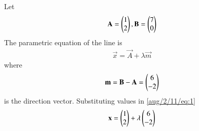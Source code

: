 Let 
\begin{align}
 \mathbf{A}=\begin{pmatrix}1\\2\end{pmatrix},
 \mathbf{B}=\begin{pmatrix}7\\0\end{pmatrix}
\end{align}
The parametric equation of the line is
\begin{align}
    \label{aug/2/11/eq:1}
     \vec{x}  =\vec{A} + \lambda \vec{m} 
\end{align}
where 
\begin{align}
\mathbf{m}= \mathbf{B-A}=\begin{pmatrix}6\\-2\end{pmatrix}
\end{align}
is the direction vector.
Substituting values in \eqref{aug/2/11/eq:1}
\begin{align}
  \mathbf{x}=\begin{pmatrix}1\\2\end{pmatrix} + \lambda\begin{pmatrix}6\\-2\end{pmatrix}
\end{align}
